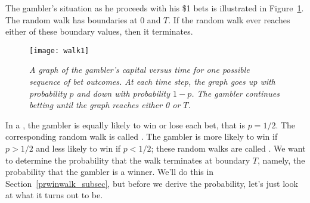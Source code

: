 The gambler's situation as he proceeds with his \$1 bets is illustrated in
Figure~\ref{LN12:fig:walk1}.  The random walk has boundaries at 0 and $T$.  If
the random walk ever reaches either of these boundary values, then it
terminates.

\begin{figure}
  \centerline{\texttt{[image: walk1]}}
  \caption{\em A graph of the gambler's capital versus time
  for one possible sequence of bet outcomes.  At each time step, the
  graph goes up with probability $p$ and down with probability $1-p$.
  The gambler continues betting until the graph reaches either 0 or $T$.}
  \label{LN12:fig:walk1}
\end{figure}

In a , the gambler is equally likely to win or lose
each bet, that is $p = 1/2$.  The corresponding random walk is called
.  The gambler is more likely to win if $p>1/2$ and
less likely to win if $p<1/2$; these random walks are called
.  We want to determine the probability that the walk
terminates at boundary $T$, namely, the probability that the gambler
is a winner.  We'll do this in Section~\ref{prwinwalk_subsec}, but
before we derive the probability, let's just look at what it turns out
to be.

